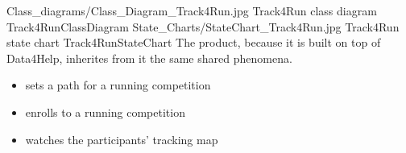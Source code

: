 \documentclass[../../rasd.tex]{subfiles}
\begin{document}
			\image {13cm} {Class_diagrams/Class_Diagram_Track4Run.jpg} {Track4Run class diagram} {Track4RunClassDiagram}
			\image {13cm} {State_Charts/StateChart_Track4Run.jpg} {Track4Run state chart} {Track4RunStateChart}
			The product, because it is built on top of Data4Help, inherites from it the same shared phenomena.

			\begin{itemize}
				\item {} sets a path for a running competition
				\item {} enrolls to a running competition
				\item {} watches the participants' tracking map			
			\end{itemize}
\end{document}
